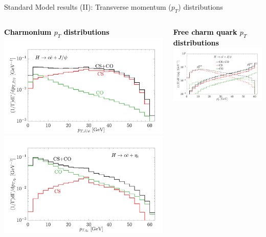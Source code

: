\documentclass[aspectratio=169]{beamer}
\begin{document}
\begin{frame}{Standard Model results (II): Transverse momentum ($p_T$) distributions}
	\begin{columns}
	\begin{column}{0.5\textwidth}
	\begin{center}
		\vspace{-1mm}\hspace{3mm}\textcolor{black}{\bf Charmonium $p_T$ distributions}
		\includegraphics[width=.75\textwidth]{figs/dGmdhptJPSM_Norm.pdf}
		\includegraphics[width=.75\textwidth]{figs/dGmdhptetaSM_Norm.pdf}
	\end{center}
	\end{column}
	\vspace{-1mm}
	\begin{column}{0.5\textwidth}
		\begin{center}
			\vspace{-1mm}\hspace{3mm}\textcolor{black}{\bf Free charm quark $p_T$ distributions}
			\includegraphics[width=.75\textwidth]{figs/dGmdcptJPSM_Norm.pdf}

\end{center}
\end{column}
\end{columns}
\end{frame}
\end{document}
